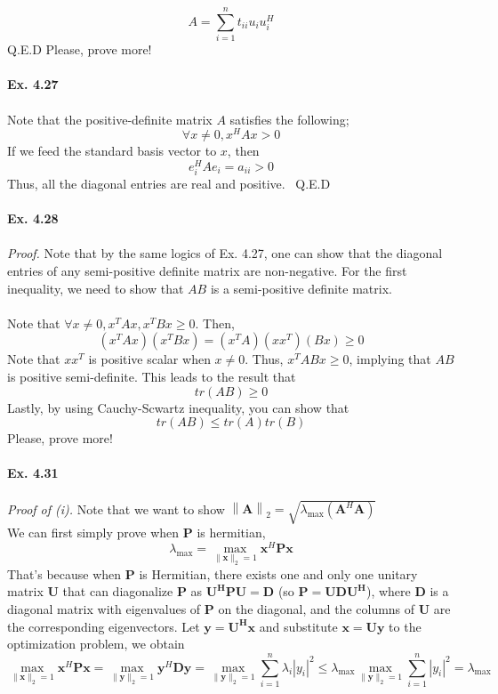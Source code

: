 \documentclass[letterpaper,12pt]{article}
\theoremstyle{definition}
\begin{document}
\begin{spacing}{1.3}{}
\[A = \sum_{i=1}^{n} t_{ii} u_i u_{i}^{H}\]
Q.E.D Please, prove more!\\\\
\textbf{Ex. 4.27}\\\\
Note that the positive-definite matrix $A$ satisfies the following; \\
\[ \forall x \neq 0, x^H A x > 0\]
If we feed the standard basis vector to $x$, then \\
\[e_{i}^{H} A e_{i} = a_{ii} > 0 \]
Thus, all the diagonal entries are real and positive. \ Q.E.D \\\\
\textbf{Ex. 4.28}\\\\
\emph{Proof.} Note that by the same logics of Ex. 4.27, one can show that the diagonal entries of any semi-positive definite matrix are non-negative. For the first inequality, we need to show that $AB$ is a semi-positive definite matrix.\\\\
Note that $\forall x \neq 0, x^T A x, x^T B x  \geq 0 $. Then,
\[(x^T A x) (x^T B x) = (x^T A)(x x^T) (Bx) \geq 0\]
Note that $x x^T$ is positive scalar when $x \neq 0$. Thus, $x^T AB x \geq 0$, implying that $AB$ is positive semi-definite. This leads to the result that
\[ tr(AB) \geq 0 \]
Lastly, by using Cauchy-Scwartz inequality, you can show that
\[tr(AB) \leq tr(A) tr(B) \]
Please, prove more! \\\\
\textbf{Ex. 4.31}\\\\
\emph{Proof of (i).} Note that we want to show $\left\| \mathbf{A}\right\|_2 = \sqrt{\lambda_{\max}(\mathbf{A}^H \mathbf{A})}$ \\
We can first simply prove when $\mathbf{P}$ is hermitian, \\
\[\lambda_{\max} = \max_{\| \mathbf{x} \|_2=1} \mathbf{x}^H \mathbf{Px}\]
That's because when $\mathbf{P}$ is Hermitian, there exists one and only one unitary matrix $\mathbf{U}$ that can diagonalize $\mathbf{P}$ as $\mathbf{U^HPU=D}$ (so $\mathbf{P=UDU^H}$), where $\mathbf{D}$ is a diagonal matrix with eigenvalues of $\mathbf{P}$ on the diagonal, and the columns of $\mathbf{U}$ are the corresponding eigenvectors. Let $\mathbf{y=U^H x}$ and substitute $\mathbf{x=Uy}$ to the optimization problem, we obtain
\[ \max_{\| \mathbf{x} \|_2=1} \mathbf{x}^H \mathbf{Px} = \max_{\| \mathbf{y} \|_2=1} \mathbf{y}^H \mathbf{Dy} = \max_{\| \mathbf{y} \|_2=1} \sum_{i=1}^n \lambda_i |y_i|^2 \le \lambda_{\max} \max_{\| \mathbf{y} \|_2=1} \sum_{i=1}^n |y_i|^2 = \lambda_{\max}\]

\end{spacing}
\end{document}
